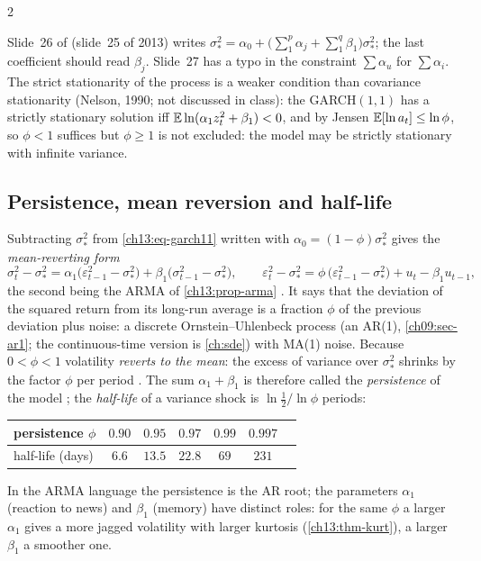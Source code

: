 \begin{paracol}{2}
\begin{coursenote}\label{ch13:cn-longrun}
Slide~26 of  (slide~25 of 2013) writes $\sigma_*^2=\alpha_0+\bigl(\sum_1^p\alpha_j+\sum_1^q\beta_1\bigr)\sigma_*^2$; the last coefficient should read $\beta_j$. Slide~27 has a typo
in the constraint $\sum\alpha_u$ for $\sum\alpha_i$. The strict stationarity of the process is a weaker condition than covariance stationarity (Nelson, 1990; not discussed in class):
the GARCH$(1,1)$ has a strictly stationary solution iff $\mathbb{E}\ln(\alpha_1z_t^2+\beta_1)<0$, and by Jensen $\mathbb{E}[\ln a_t]\le\ln\phi$, so $\phi<1$ suffices but $\phi\ge1$ is not excluded: the model may be
strictly stationary with infinite variance.
\end{coursenote}

\subsection{Persistence, mean reversion and half-life}\label{ch13:sec-persist}
Subtracting $\sigma_*^2$ from \eqref{ch13:eq-garch11} written with $\alpha_0=(1-\phi)\sigma_*^2$ gives the \emph{mean-reverting form}
\begin{equation}\label{ch13:eq-meanrev}
  \sigma_t^2-\sigma_*^2=\alpha_1\bigl(\varepsilon_{t-1}^2-\sigma_*^2\bigr)+\beta_1\bigl(\sigma_{t-1}^2-\sigma_*^2\bigr),\qquad
  \varepsilon_t^2-\sigma_*^2=\phi\,\bigl(\varepsilon_{t-1}^2-\sigma_*^2\bigr)+u_t-\beta_1u_{t-1},
\end{equation}
the second being the ARMA of \cref{ch13:prop-arma} . It says that the deviation of the squared return from its long-run
average is a fraction $\phi$ of the previous deviation plus noise: a discrete Ornstein--Uhlenbeck process (an AR(1), \cref{ch09:sec-ar1}; the continuous-time version is \cref{ch:sde}) with MA(1) noise. Because $0<\phi<1$ volatility \emph{reverts to the mean}: the
excess of variance over $\sigma_*^2$ shrinks by the factor $\phi$ per period . The sum $\alpha_1+\beta_1$ is therefore called the \emph{persistence} of the model ; the
\emph{half-life} of a variance shock is $\ln\frac12/\ln\phi$ periods:
\begin{center}\small
\begin{tabular}{@{}lcccccc@{}}
\toprule
persistence $\phi$ & $0.90$ & $0.95$ & $0.97$ & $0.99$ & $0.997$\\
\midrule
half-life (days) & $6.6$ & $13.5$ & $22.8$ & $69$ & $231$\\
\bottomrule
\end{tabular}
\end{center}
In the ARMA language the persistence is the AR root; the parameters $\alpha_1$ (reaction to news) and $\beta_1$ (memory) have distinct roles: for the same $\phi$ a larger $\alpha_1$ gives a more
jagged volatility with larger kurtosis (\cref{ch13:thm-kurt}), a larger $\beta_1$ a smoother one.


\end{paracol}
